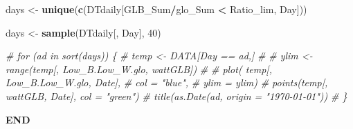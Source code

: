 \documentclass[
  10pt,
  a4paper,oneside]{article}
\newenvironment{Shaded}{\begin{snugshade}}{\end{snugshade}}
\newcommand{\CommentTok}[1]{\textcolor[rgb]{0.56,0.35,0.01}{\textit{#1}}}
\newcommand{\DecValTok}[1]{\textcolor[rgb]{0.00,0.00,0.81}{#1}}
\newcommand{\FunctionTok}[1]{\textcolor[rgb]{0.13,0.29,0.53}{\textbf{#1}}}
\newcommand{\NormalTok}[1]{#1}
\newcommand{\OtherTok}[1]{\textcolor[rgb]{0.56,0.35,0.01}{#1}}
\newcommand{\SpecialCharTok}[1]{\textcolor[rgb]{0.81,0.36,0.00}{\textbf{#1}}}
\begin{document}
\begin{Shaded}
\begin{Highlighting}[]
\NormalTok{days }\OtherTok{\textless{}{-}} \FunctionTok{unique}\NormalTok{(}\FunctionTok{c}\NormalTok{(DTdaily[GLB\_Sum}\SpecialCharTok{/}\NormalTok{glo\_Sum }\SpecialCharTok{\textless{}}\NormalTok{ Ratio\_lim, Day]))}

\NormalTok{days }\OtherTok{\textless{}{-}} \FunctionTok{sample}\NormalTok{(DTdaily[, Day], }\DecValTok{40}\NormalTok{)}

\CommentTok{\# for (ad in sort(days)) \{}
\CommentTok{\#   temp \textless{}{-} DATA[Day == ad,]}
\CommentTok{\#}
\CommentTok{\#   ylim \textless{}{-} range(temp[, Low\_B.Low\_W.glo, wattGLB])}
\CommentTok{\#}
\CommentTok{\#   plot(  temp[, Low\_B.Low\_W.glo, Date],}
\CommentTok{\#          col = "blue",}
\CommentTok{\#          ylim = ylim)}
\CommentTok{\#   points(temp[, wattGLB, Date], col = "green")}
\CommentTok{\#   title(as.Date(ad, origin = "1970{-}01{-}01"))}
\CommentTok{\# \}}
\end{Highlighting}
\end{Shaded}

\textbf{END}
\end{document}
